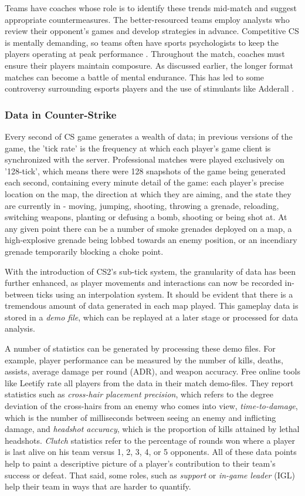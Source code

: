 Teams have coaches whose role is to identify these trends mid-match and suggest appropriate countermeasures. The better-resourced teams employ analysts who review their opponent's games and develop strategies in advance. Competitive CS is mentally demanding, so teams often have sports psychologists to keep the players operating at peak performance \cite{sportspsych}. Throughout the match, coaches must ensure their players maintain composure. As discussed earlier, the longer format matches can become a battle of mental endurance. This has led to some controversy surrounding esports players and the use of stimulants like Adderall \cite{adderall}.

\subsubsection{Data in Counter-Strike}

Every second of CS game generates a wealth of data; in previous versions of the game, the 'tick rate' is the frequency at which each player's game client is synchronized with the server. Professional matches were played exclusively on '128-tick', which means there were 128 snapshots of the game being generated each second, containing every minute detail of the game: each player's precise location on the map, the direction at which they are aiming, and the state they are currently in - moving, jumping, shooting, throwing a grenade, reloading, switching weapons, planting or defusing a bomb, shooting or being shot at. At any given point there can be a number of smoke grenades deployed on a map, a high-explosive grenade being lobbed towards an enemy position, or an incendiary grenade temporarily blocking a choke point. 

With the introduction of CS2's sub-tick system, the granularity of data has been further enhanced, as player movements and interactions can now be recorded in-between ticks using an interpolation system. It should be evident that there is a tremendous amount of data generated in each map played. This gameplay data is stored in a \textit{demo file}, which can be replayed at a later stage or processed for data analysis.

A number of statistics can be generated by processing these demo files. For example, player performance can be measured by the number of kills, deaths, assists, average damage per round (ADR), and weapon accuracy. Free online tools like Leetify rate all players from the data in their match demo-files. They report statistics such as \textit{cross-hair placement precision}, which refers to the degree deviation of the cross-hairs from an enemy who comes into view, \textit{time-to-damage}, which is the number of milliseconds between seeing an enemy and inflicting damage, and \textit{headshot accuracy}, which is the proportion of kills attained by lethal headshots. \textit{Clutch} statistics refer to the percentage of rounds won where a player is last alive on his team versus 1, 2, 3, 4, or 5 opponents. All of these data points help to paint a descriptive picture of a player's contribution to their team's success or defeat. That said, some roles, such as \textit{support} or \textit{in-game leader} (IGL) help their team in ways that are harder to quantify.


